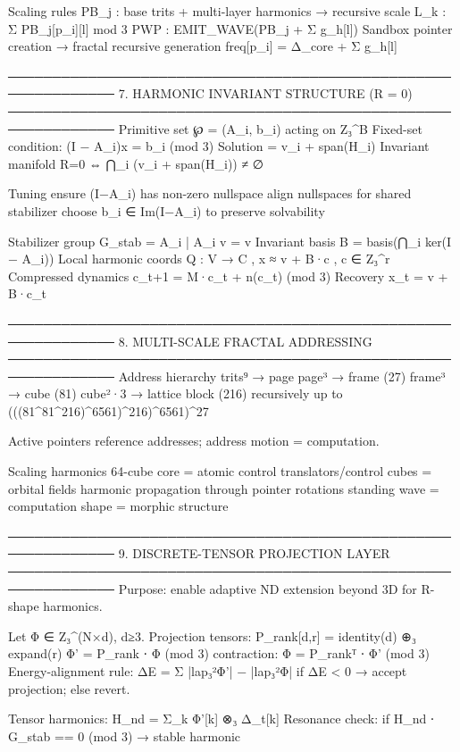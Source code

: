 Scaling rules
    PB_j : base trits + multi-layer harmonics → recursive scale
    L_k  : Σ PB_j[p_i][l] mod 3
    PWP  : EMIT_WAVE(PB_j + Σ g_h[l])
    Sandbox pointer creation → fractal recursive generation
    freq[p_i] = Δ_core + Σ g_h[l]

──────────────────────────────────────────────────────────────
7. HARMONIC INVARIANT STRUCTURE  (R = 0)
──────────────────────────────────────────────────────────────
Primitive set ℘ = {(A_i, b_i)} acting on Z₃^B
Fixed-set condition: (I − A_i)x = b_i  (mod 3)
Solution = v_i + span(H_i)
Invariant manifold  R=0  ⇔  ⋂_i (v_i + span(H_i)) ≠ ∅

Tuning
    ensure (I−A_i) has non-zero nullspace
    align nullspaces for shared stabilizer
    choose b_i ∈ Im(I−A_i) to preserve solvability

Stabilizer group
    G_stab = {A_i | A_i v = v}
Invariant basis
    B = basis(⋂_i ker(I − A_i))
Local harmonic coords
    Q : V → C ,  x ≈ v + B·c ,  c ∈ Z₃^r
Compressed dynamics
    c_{t+1} = M·c_t + n(c_t)  (mod 3)
Recovery
    x_t = v + B·c_t

──────────────────────────────────────────────────────────────
8. MULTI-SCALE FRACTAL ADDRESSING
──────────────────────────────────────────────────────────────
Address hierarchy
    trits⁹  → page
    page³   → frame (27)
    frame³  → cube  (81)
    cube²·3 → lattice block (216)
    recursively up to (((81^81^216)^6561)^216)^6561)^27

Active pointers reference addresses; address motion = computation.

Scaling harmonics
    64-cube core = atomic control
    translators/control cubes = orbital fields
    harmonic propagation through pointer rotations
    standing wave = computation shape = morphic structure

──────────────────────────────────────────────────────────────
9. DISCRETE-TENSOR PROJECTION LAYER
──────────────────────────────────────────────────────────────
Purpose: enable adaptive ND extension beyond 3D for R-shape harmonics.

Let Φ ∈ Z₃^(N×d),  d≥3.
Projection tensors:
    P_rank[d,r] = identity(d) ⊕₃ expand(r)
    Φ' = P_rank ⋅ Φ  (mod 3)
    contraction: Φ = P_rankᵀ ⋅ Φ'  (mod 3)
Energy-alignment rule:
    ΔE = Σ |lap₃²Φ'| − |lap₃²Φ|
    if ΔE < 0 → accept projection; else revert.

Tensor harmonics:
    H_nd = Σ_k Φ'[k] ⊗₃ Δ_t[k]
    Resonance check:
        if H_nd ⋅ G_stab == 0 (mod 3) → stable harmonic

